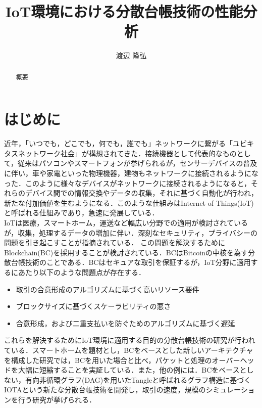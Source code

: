 \documentclass[japanese, macos]{KU2}
\begin{document}
\fontsize{12}{20} \selectfont

\title{IoT環境における分散台帳技術の性能分析}
\author{渡辺 隆弘}
\maketitle %

\begin{abstract}
概要
\end{abstract}


\tableofcontents

\chapter{はじめに}
近年，「いつでも，どこでも，何でも，誰でも」ネットワークに繋がる「ユビキタスネットワーク社会」が構想されてきた．接続機器として代表的なものとして，従来はパソコンやスマートフォンが挙げられるが，センサーデバイスの普及に伴い，車や家電といった物理機器，建物もネットワークに接続されるようになった．このように様々なデバイスがネットワークに接続されるようになると，それらのデバイス間での情報交換やデータの収集，それに基づく自動化が行われ，新たな付加価値を生むようになる．このような仕組みはInternet of Things(IoT)と呼ばれる仕組みであり，急速に発展している\cite{Atzori2010}\cite{Gubbi2013}．\\
IoTは医療，スマートホーム，運送など幅広い分野での適用が検討されているが，収集，処理するデータの増加に伴い．深刻なセキュリティ，プライバシーの問題を引き起こすことが指摘されている\cite{dorri2017towards}．
この問題を解決するためにBlockchain(BC)を採用することが検討されている．BCはBitcoin\cite{nakamoto2008bitcoin}の中核を為す分散台帳技術のことである．BCはセキュアな取引を保証するが，IoT分野に適用するにあたり以下のような問題点が存在する．

\begin{itemize}
\item 取引の合意形成のアルゴリズムに基づく高いリソース要件
\item ブロックサイズに基づくスケーラビリティの悪さ
\item 合意形成，および二重支払いを防ぐためのアルゴリズムに基づく遅延
\end{itemize}

これらを解決するためにIoT環境に適用する目的の分散台帳技術の研究が行われている．スマートホームを題材とし，BCをベースとした新しいアーキテクチャを構成した研究\cite{dorri2017towards}では，BCを用いた場合と比べ，パケットと処理のオーバーヘッドを大幅に短縮することを実証している．また，他の例には．BCをベースとしない，有向非循環グラフ(DAG)を用いたTangleと呼ばれるグラフ構造に基づくIOTAという新たな分散台帳技術を開発し，取引の速度，規模のシミュレーションを行う研究\cite{popov2016tangle}\cite{kusmierz2017first}が挙げられる．
\end{document}
